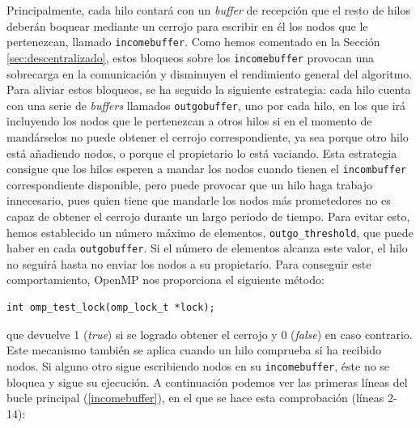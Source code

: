 \documentclass[a4paper,12pt]{article}
\begin{document}
Principalmente, cada hilo contará con un \textit{buffer} de recepción que el resto de hilos deberán boquear mediante un cerrojo para escribir en él los nodos que le pertenezcan, llamado \verb|incomebuffer|. Como hemos comentado en la Sección \ref{sec:descentralizado}, estos bloqueos sobre los \verb|incomebuffer| provocan una sobrecarga en la comunicación y disminuyen el rendimiento general del algoritmo. Para aliviar estos bloqueos, se ha seguido la siguiente estrategia: cada hilo cuenta con una serie de \textit{buffers} llamados \verb|outgobuffer|, uno por cada hilo, en los que irá incluyendo los nodos que le pertenezcan a otros hilos si en el momento de mandárselos no puede obtener el cerrojo correspondiente, ya sea porque otro hilo está añadiendo nodos, o porque el propietario lo está vaciando. Esta estrategia consigue que los hilos esperen a mandar los nodos cuando tienen el \verb|incombuffer| correspondiente disponible, pero puede provocar que un hilo haga trabajo innecesario, pues quien tiene que mandarle los nodos más prometedores no es capaz de obtener el cerrojo durante un largo periodo de tiempo. Para evitar esto, hemos establecido un número máximo de elementos, \verb|outgo_threshold|, que puede haber en cada \verb|outgobuffer|. Si el número de elementos alcanza este valor, el hilo no seguirá hasta no enviar los nodos a su propietario. Para conseguir este comportamiento, OpenMP nos proporciona el siguiente método:

\begin{lstlisting}
int omp_test_lock(omp_lock_t *lock);
\end{lstlisting}

\noindent que devuelve 1 (\textit{true}) si se logrado obtener el cerrojo y 0 (\textit{false}) en caso contrario. Este mecanismo también se aplica cuando un hilo comprueba si ha recibido nodos. Si alguno otro sigue escribiendo nodos en su \verb|incomebuffer|, éste no se bloquea y sigue su ejecución. A continuación podemos ver las primeras líneas del bucle principal (\ref{incomebuffer}), en el que se hace esta comprobación (líneas 2-14):
\end{document}
